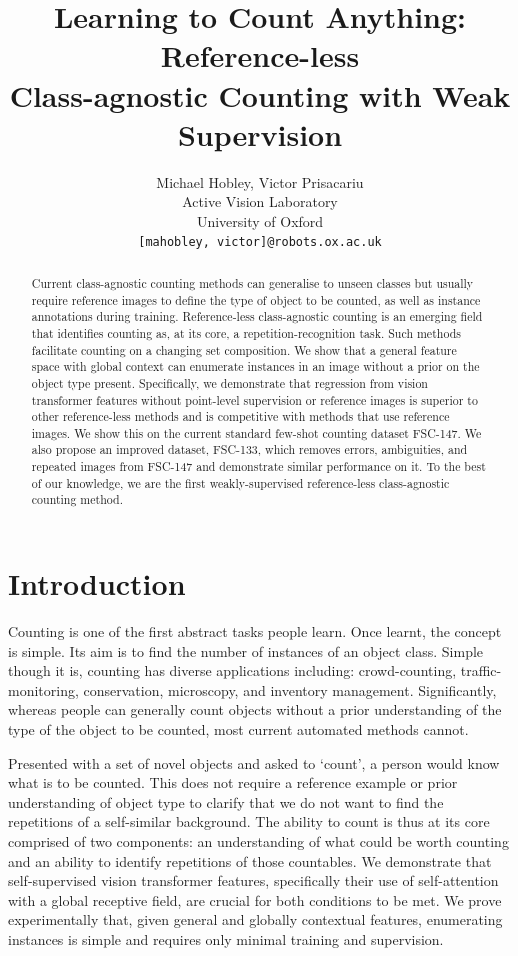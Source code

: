 \documentclass[letterpaper, 11pt]{IEEEtran}
\author{
    Michael Hobley, Victor Prisacariu \\ Active Vision Laboratory\\
  University of Oxford\\
  \texttt{[mahobley, victor]@robots.ox.ac.uk} \\
}
\title{Learning to Count Anything: Reference-less \\ Class-agnostic Counting with Weak Supervision}
\begin{document}
\maketitle

\begin{abstract}
Current class-agnostic counting methods can generalise to unseen classes but usually require reference images to define the type of object to be counted, as well as instance annotations during training. Reference-less class-agnostic counting is an emerging field that identifies counting as, at its core, a repetition-recognition task. Such methods facilitate counting on a changing set composition. We show that a general feature space with global context can enumerate instances in an image without a prior on the object type present. Specifically, we demonstrate that regression from vision transformer features without point-level supervision or reference images is superior to other reference-less methods and is competitive with methods that use reference images. We show this on the current standard few-shot counting dataset FSC-147. We also propose an improved dataset, FSC-133, which removes errors, ambiguities, and repeated images from FSC-147 and demonstrate similar performance on it. To the best of our knowledge, we are the first weakly-supervised reference-less class-agnostic counting method. 
\end{abstract}


\section{Introduction}
\label{Introduction}

Counting is one of the first abstract tasks people learn. Once learnt, the concept is simple. Its aim is to find the number of instances of an object class. 
    Simple though it is, counting has diverse applications including: crowd-counting, traffic-monitoring, conservation, microscopy, and inventory management.
    Significantly, whereas people can generally count objects without a prior understanding of the type of the object to be counted, most current automated methods cannot.
    
     Presented with a set of novel objects and asked to `count', a person would know what is to be counted. This does not require a reference example or prior understanding of object type to clarify that we do not want to find the repetitions of a self-similar background.
    The ability to count is thus at its core comprised of two components: an understanding of what could be worth counting and an ability to identify repetitions of those countables.
    We demonstrate that self-supervised vision transformer features, specifically their use of self-attention with a global receptive field, are crucial for both conditions to be met. 
    We prove experimentally that, given general and globally contextual features, enumerating instances is simple and  requires only minimal training and supervision. 
    
\end{document}
